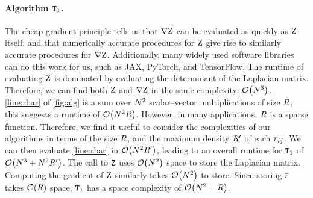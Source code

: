 \documentclass[11pt,a4paper]{article}
\theoremstyle{definition}
\begin{document}
\paragraph{Algorithm {\normalfont $\texttt{T}_1$}.} The cheap gradient principle tells us that $\nabla {\mathrm{Z}}$ can be evaluated as quickly as ${\mathrm{Z}}$ itself, and that numerically accurate procedures for ${\mathrm{Z}}$ give rise to similarly accurate procedures for $\nabla {\mathrm{Z}}$.
Additionally, many widely used software libraries can do this work for us, such as JAX, PyTorch, and TensorFlow.
The runtime of evaluating ${\mathrm{Z}}$ is dominated by evaluating the determinant of the Laplacian matrix.
Therefore, we can find both ${\mathrm{Z}}$ and $\nabla{\mathrm{Z}}$ in the same complexity: $\mathcal{O}\!\left({N}^3\right)$.
\cref{line:rbar} of \cref{fig:alg} is a sum over ${N}^2$ scalar--vector multiplications of size ${R}$, this suggests a runtime of $\mathcal{O}\!\left( {N}^2{R}\right)$.
However, in many applications, ${R}$ is a sparse function.
Therefore, we find it useful to consider the complexities of our algorithms in terms of the size ${R}$, and the maximum density ${R'}$ of each ${r_{ij}}$.
We can then evaluate \cref{line:rbar} in $\mathcal{O}\!\left({N}^2{R'}\right)$, leading to an overall runtime for $\texttt{T}_1$ of $\mathcal{O}\!\left({N}^3+{N}^2{R'}\right)$.
The call to $\texttt{Z}$ uses $\mathcal{O}\!\left({N}^2\right)$ space to store the Laplacian matrix.
Computing the gradient of ${\mathrm{Z}}$ similarly takes $\mathcal{O}\!\left({N}^2\right)$ to store.%
Since storing ${\overline{r}}$ takes $\mathcal{O}\!\left({R}\right)$ space, $\texttt{T}_1$
has a space complexity of $\mathcal{O}\!\left({N}^2+{R}\right)$.
\end{document}
